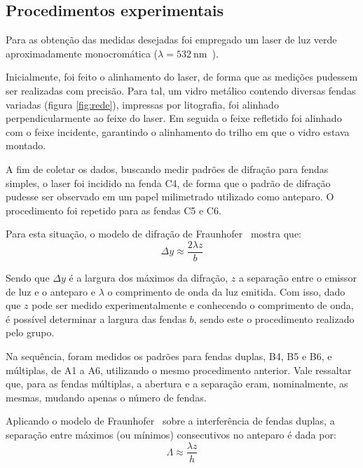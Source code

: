 \subsection{Procedimentos experimentais}

Para as obtenção das medidas desejadas foi empregado um laser de luz verde aproximadamente monocromática ($\lambda = \SI{532}{\nano\meter}$~\cite{ref:roteiro}).

Inicialmente, foi feito o alinhamento do laser, de forma que as medições pudessem ser realizadas com precisão. Para tal, um vidro metálico contendo diversas fendas variadas (figura \ref{fig:rede}), impressas por litografia, foi alinhado perpendicularmente ao feixe do laser. Em seguida o feixe refletido foi alinhado com o feixe incidente, garantindo o alinhamento do trilho em que o vidro estava montado.



A fim de coletar os dados, buscando medir padrões de difração para fendas simples, o laser foi incidido na fenda C4, de forma que o padrão de difração pudesse ser observado em um papel milimetrado utilizado como anteparo. O procedimento foi repetido para as fendas C5 e C6.

Para esta situação, o modelo de difração de Fraunhofer~\cite{ref:otica} mostra que:
\begin{equation*}
    \Delta y \approx \frac{2 \lambda z}{b} \label{eq:difr}
\end{equation*}

Sendo que $\Delta y$ é a largura dos máximos da difração, $z$ a separação entre o emissor de luz e o anteparo e $\lambda$ o comprimento de onda da luz emitida. Com isso, dado que $z$ pode ser medido experimentalmente e conhecendo o comprimento de onda, é possível determinar a largura das fendas $b$, sendo este o procedimento realizado pelo grupo.

Na sequência, foram medidos os padrões para fendas duplas, B4, B5 e B6, e múltiplas, de A1 a A6, utilizando o mesmo procedimento anterior. Vale ressaltar que, para as fendas múltiplas, a abertura e a separação eram, nominalmente, as mesmas, mudando apenas o número de fendas.

Aplicando o modelo de Fraunhofer~\cite{ref:otica} sobre a interferência de fendas duplas, a separação entre máximos (ou mínimos) consecutivos no anteparo é dada por:
\begin{equation}
    \Lambda \approx \frac{\lambda z}{h} \label{eq:duplas}
\end{equation}

